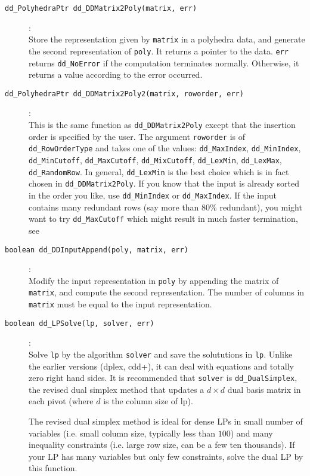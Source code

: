 \documentclass[11pt]{article}
\newcommand {\0} {{\bf 0}}
\begin{document}
\begin{description}
\item[{\tt dd\_PolyhedraPtr dd\_DDMatrix2Poly(matrix, err)}]:\\
Store the representation given by {\tt matrix} in a polyhedra data, and
generate the second representation of {\tt *poly}.  It returns
a pointer to the data. {\tt *err}
returns {\tt dd\_NoError} if the computation terminates normally.  Otherwise,
it returns a value according to the error occurred.

\item[{\tt dd\_PolyhedraPtr dd\_DDMatrix2Poly2(matrix, roworder, err)}]:\\
This is the same function as  {\tt dd\_DDMatrix2Poly} except that the insertion
order is specified by the user.  The argument {\tt roworder} is of {\tt dd\_RowOrderType}
and takes one of the values:
  {\tt dd\_MaxIndex}, {\tt dd\_MinIndex}, {\tt dd\_MinCutoff}, {\tt dd\_MaxCutoff}, {\tt dd\_MixCutoff},
   {\tt dd\_LexMin}, {\tt dd\_LexMax}, {\tt dd\_RandomRow}.   In general, {\tt dd\_LexMin} is
the best choice which is in fact chosen in {\tt dd\_DDMatrix2Poly}.  If you know that 
the input is already sorted in the order you like, use  {\tt dd\_MinIndex} or  {\tt dd\_MaxIndex}.
If the input contains many redundant rows (say more than $80\%$ redundant),
you might want to try {\tt dd\_MaxCutoff} which might result in much faster termination,
see \cite{abs-hgach-97,fp-ddmr-96}

\item[{\tt boolean dd\_DDInputAppend(poly, matrix, err)}]:\\
Modify the input representation in {\tt *poly}
by appending the matrix of {\tt *matrix}, and compute
the second representation.  The number of columns in
{\tt *matrix} must be equal to the input representation.

\item[{\tt boolean dd\_LPSolve(lp, solver, err)}]:\\
Solve {\tt lp} by the algorithm {\tt solver} and save
the solututions in {\tt *lp}.  Unlike the earlier versions
(dplex, cdd+), it can deal with equations and totally zero right
hand sides.   It is recommended that {\tt solver} is
{\tt dd\_DualSimplex}, the revised dual simplex method
that updates a $d\times d$ dual basis matrix in each pivot (where
$d$ is the column size of lp).

The revised dual simplex method is ideal for dense LPs in small number of variables 
(i.e. small column size, typically less than $100$)
and many inequality constraints (i.e. large row size, can be a few ten thousands).  
If your LP has many variables but only few constraints, solve the dual LP by
this function.


\end{description}
\end{document}
